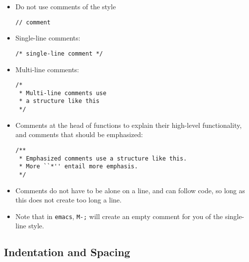 \documentclass[11pt,onecolumn]{article}
\begin{document}
\begin{itemize}
\item Do not use comments of the style

    \begin{minipage}{3in}
      \footnotesize
      \lstset{language=C}
      \begin{lstlisting}
// comment
      \end{lstlisting}
    \end{minipage}
\item Single-line comments:

    \begin{minipage}{3in}
      \footnotesize
      \lstset{language=C}
      \begin{lstlisting}
/* single-line comment */
      \end{lstlisting}
    \end{minipage}
\item Multi-line comments:

    \begin{minipage}{3in}
      \footnotesize
      \lstset{language=C}
      \begin{lstlisting}
/*
 * Multi-line comments use
 * a structure like this
 */
      \end{lstlisting}
    \end{minipage}
\item Comments at the head of functions to explain their high-level
  functionality, and comments that should be emphasized:

    \begin{minipage}{3in}
      \footnotesize
      \lstset{language=C}
      \begin{lstlisting}
/**
 * Emphasized comments use a structure like this.
 * More ``*'' entail more emphasis.
 */
      \end{lstlisting}
    \end{minipage}
\item Comments do not have to be alone on a line, and can follow code,
  so long as this does not create too long a line.
\item Note that in {\tt emacs}, {\tt M-;} will create an empty comment
  for you of the single-line style.
\end{itemize}

\subsection{Indentation and Spacing}
\end{document}

